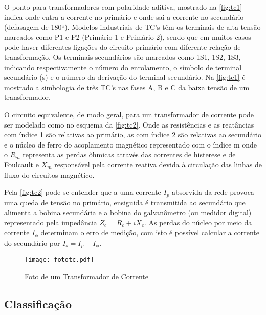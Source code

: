 			O ponto para transformadores com polaridade aditiva, mostrado na \autoref{fig:tc1} indica onde entra a corrente no primário e onde sai a corrente no secundário (defasagem de 180º). Modelos industriais de TC’s têm os terminais de alta tensão marcados como P1 e P2 (Primário 1 e Primário 2), sendo que em muitos casos pode haver diferentes ligações do circuito primário com diferente relação de transformação. Os terminais secundários são marcados como 1S1, 1S2, 1S3, indicando respectivamente o número do enrolamento, o símbolo de terminal secundário (s) e o número da derivação do terminal secundário. Na \autoref{fig:tc1} é mostrado a simbologia de três TC's nas fases A, B e C da baixa tensão de um transformador.\par
			O circuito equivalente, de modo geral, para um transformador de corrente pode ser modelado como no esquema da \autoref{fig:tc2}. Onde as resistências e as reatâncias com índice 1 são relativas ao primário, as com índice 2 são relativas ao secundário e o núcleo de ferro do acoplamento magnético representado com o índice m onde o $R_m$ representa as perdas ôhmicas através das correntes de histerese e de Foulcault e $X_m$ responsável pela corrente reativa devida à circulação das linhas de fluxo do circuitos magnético. \cite{mamedemanual}\par
			Pela \autoref{fig:tc2} pode-se entender que a uma corrente $I_p$ absorvida da rede provoca uma queda de tensão no primário, ensiguida é transmitida ao secundário que alimenta a bobina secundária e a bobina do galvanômetro (ou medidor digital) representado pela impedância $Z_c=R_c+iX_c$. As perdas do núcleo por meio da corrente $I_\phi$ determinam o erro de medição, com isto é possível calcular a corrente do secundário por $I_s=I_p-I_\phi$.\par
			\begin{figure}[htb]
			  \caption{Foto de um Transformador de Corrente}
			  \centering
			  \texttt{[image: fototc.pdf]}
			  \label{fig:fototc}
			\end{figure}

		\subsection{Classificação}
